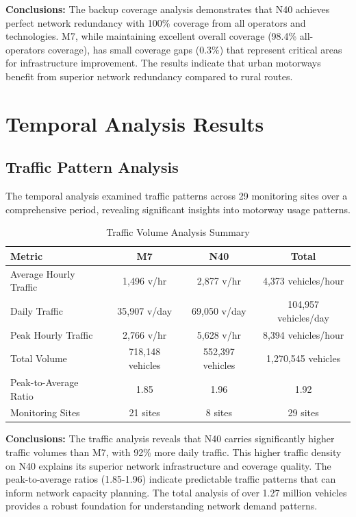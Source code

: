 \documentclass[MScCS]{uccthesis}
\begin{document}
\textbf{Conclusions:} The backup coverage analysis demonstrates that N40 achieves perfect network redundancy with 100\% coverage from all operators and technologies. M7, while maintaining excellent overall coverage (98.4\% all-operators coverage), has small coverage gaps (0.3\%) that represent critical areas for infrastructure improvement. The results indicate that urban motorways benefit from superior network redundancy compared to rural routes.

\section{Temporal Analysis Results}

\subsection{Traffic Pattern Analysis}

The temporal analysis examined traffic patterns across 29 monitoring sites over a comprehensive period, revealing significant insights into motorway usage patterns.

\begin{table}[H]
\centering
\caption{Traffic Volume Analysis Summary}
\label{tab:traffic_analysis}
\begin{tabular}{|l|c|c|c|}
\hline
\textbf{Metric} & \textbf{M7} & \textbf{N40} & \textbf{Total} \\
\hline
Average Hourly Traffic & 1,496 v/hr & 2,877 v/hr & 4,373 vehicles/hour \\
\hline
Daily Traffic & 35,907 v/day & 69,050 v/day & 104,957 vehicles/day \\
\hline
Peak Hourly Traffic & 2,766 v/hr & 5,628 v/hr & 8,394 vehicles/hour \\
\hline
Total Volume & 718,148 vehicles & 552,397 vehicles & 1,270,545 vehicles \\
\hline
Peak-to-Average Ratio & 1.85 & 1.96 & 1.92 \\
\hline
Monitoring Sites & 21 sites & 8 sites & 29 sites \\
\hline
\end{tabular}
\end{table}

\textbf{Conclusions:} The traffic analysis reveals that N40 carries significantly higher traffic volumes than M7, with 92\% more daily traffic. This higher traffic density on N40 explains its superior network infrastructure and coverage quality. The peak-to-average ratios (1.85-1.96) indicate predictable traffic patterns that can inform network capacity planning. The total analysis of over 1.27 million vehicles provides a robust foundation for understanding network demand patterns.
\end{document}
